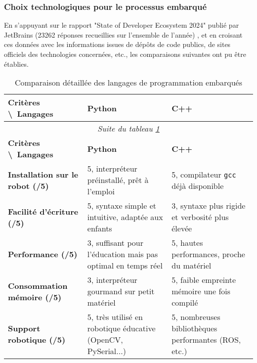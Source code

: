 \subsubsection{Choix technologiques pour le processus embarqué} \label{sec:choix_robot}

En s’appuyant sur le rapport "State of Developer Ecosystem 2024" publié par JetBrains (23262 réponses recueillies sur l’ensemble de l’année) \autocite{noauthor_software_nodate}, et en croisant ces données avec les informations issues de dépôts de code publics, de sites officiels des technologies concernées, etc., les comparaisons suivantes ont pu être établies.

\begin{longtable}{|p{}|p{}|p{}|}
\caption{\label{tab:comparison_robot_languages} Comparaison détaillée des langages de programmation embarqués} \\

\hline
\textbf{Critères \textbackslash\ Langages} & \textbf{Python} & \textbf{C++} \\
\hline
\endfirsthead

\multicolumn{3}{c}{\textit{Suite du tableau \ref{tab:comparison_robot_languages}}} \\
\hline
\textbf{Critères \textbackslash\ Langages} & \textbf{Python} & \textbf{C++} \\
\hline
\endhead

\textbf{Installation sur le robot (/5)} & 
5, interpréteur préinstallé, prêt à l’emploi & 
5, compilateur \texttt{gcc} déjà disponible \\
\hline

\textbf{Facilité d’écriture (/5)} & 
5, syntaxe simple et intuitive, adaptée aux enfants & 
3, syntaxe plus rigide et verbosité plus élevée \\
\hline

\textbf{Performance (/5)} & 
3, suffisant pour l’éducation mais pas optimal en temps réel & 
5, hautes performances, proche du matériel \\
\hline

\textbf{Consommation mémoire (/5)} & 
3, interpréteur gourmand sur petit matériel & 
5, faible empreinte mémoire une fois compilé \\
\hline

\textbf{Support robotique (/5)} & 
5, très utilisé en robotique éducative (OpenCV, PySerial...) & 
5, nombreuses bibliothèques performantes (ROS, etc.) \\
\hline


\end{longtable}
